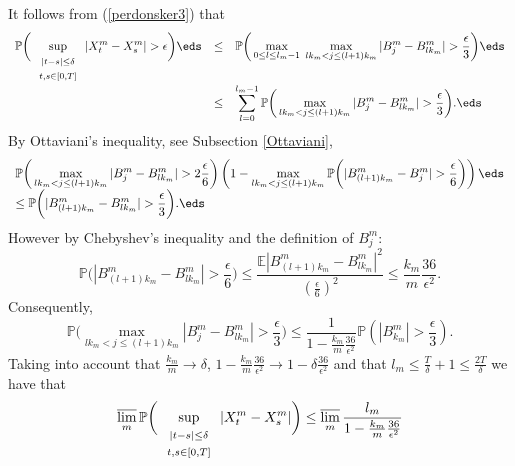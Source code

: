 \documentclass[preprint]{imsart}
\def\P{\mathbb P}
\def\E{\mathbb E}
\def\ds{\displaystyle}
\begin{document}
{It follows from (\ref{perdonsker3}) that
$$
  \begin{array}{lll}
   \ds
\P\bigg(
\sup_{
\begin{array}{c}
\begin{scriptstyle}
|t-s|\leq \delta
\end{scriptstyle}
 \\ \begin{scriptstyle}
 t,s\in [0,T]
 \end{scriptstyle}
\end{array}
} |X_t^m-X_s^m| >\epsilon \bigg)
\eds & \leq& \ds
\P \bigg(
\max_{0\leq l\leq l_m-1}\;
\max_{lk_m<j\leq(l+1)k_m}
|B_j^m- B_{lk_m}^m| >\frac{\epsilon}{3}\bigg)
\eds \\
&\leq &\ds
\sum_{l=0}^{l_m-1} \P\bigg(
\max_{lk_m<j\leq(l+1)k_m}
|B_j^m- B_{lk_m}^m| >\frac{\epsilon}{3}\bigg).
\eds
\end{array}
$$
By Ottaviani's inequality, see Subsection
\ref{Ottaviani},
$$\begin{array}{l}\ds
\P\bigg(
\max_{lk_m<j\leq(l+1)k_m}
|B_j^m- B_{lk_m}^m| >2\frac{\epsilon}{6}\bigg)
\left(
1-
\max_{lk_m<j\leq(l+1)k_m}
\P\bigg(|B_{(l+1)k_m}^m- B_{j}^m| >\frac{\epsilon}{6}\bigg)
\right)
\eds\\\ds
\leq \P\bigg(
|B_{(l+1)k_m}^m- B_{lk_m}^m| >\frac{\epsilon}{3}\bigg).
\eds\end{array}
$$
However by Chebyshev's inequality and the definition of
$B^m_j$:
$$
\P\bigg(
|B_{(l+1)k_m}^m- B_{lk_m}^m| >\frac{\epsilon}{6}\bigg)
\leq
\frac{\E\left|B_{(l+1)k_m}^m- B_{lk_m}^m\right|^2}
{\left(\frac{\epsilon}{6}\right)^2}
\leq \frac{k_m}{m}\frac{36}{\epsilon^2}.
$$
Consequently,
$$
\P\bigg(
\max_{lk_m<j\leq(l+1)k_m}
|B_j^m- B_{lk_m}^m| >\frac{\epsilon}{3}\bigg)
\leq
\frac{1}{1-\frac{k_m}{m}\frac{36}{\epsilon^2}}
\P\left(|B_{k_m}^m|>\frac{\epsilon}{3}\right).
$$
Taking into account that $\frac{k_m}{m}\to\delta$,
$1-\frac{k_m}{m}\frac{36}{\epsilon^2}\to
1-\delta\frac{36}{\epsilon^2}$ and that $l_m\leq
\frac{T}{\delta}+1\leq \frac{2T}{\delta}$ we have that
$$
\overline{\lim_m}\, \P\bigg(
\sup_{
\begin{array}{c}
\begin{scriptstyle}
|t-s|\leq \delta
\end{scriptstyle}
 \\ \begin{scriptstyle}
 t,s\in [0,T]
 \end{scriptstyle}
\end{array}
} |X_t^m-X_s^m|
\bigg) \leq
\overline{\lim_m}\,
\frac{l_m}{1-\frac{k_m}{m}\frac{36}{\epsilon^2}}
$$}
\end{document}
